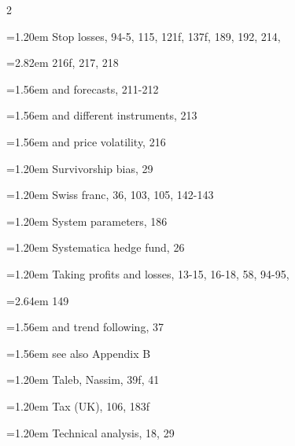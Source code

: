 {\begin{multicols}{2}
\par \noindent\hangindent=1.20em\hspace*{0.00em} Stop losses, 94-5, 115, 121f, 137f, 189, 192, 214,
\par \noindent\hangindent=2.82em\hspace*{1.62em} 216f, 217, 218
\par \noindent\hangindent=1.56em\hspace*{0.36em} and forecasts, 211-212
\par \noindent\hangindent=1.56em\hspace*{0.36em} and different instruments, 213
\par \noindent\hangindent=1.56em\hspace*{0.36em} and price volatility, 216
\par \noindent\hangindent=1.20em\hspace*{0.00em} Survivorship bias, 29
\par \noindent\hangindent=1.20em\hspace*{0.00em} Swiss franc, 36, 103, 105, 142-143
\par \noindent\hangindent=1.20em\hspace*{0.00em} System parameters, 186
\par \noindent\hangindent=1.20em\hspace*{0.00em} Systematica hedge fund, 26
\par \noindent\hangindent=1.20em\hspace*{0.00em} Taking profits and losses, 13-15, 16-18, 58, 94-95,
\par \noindent\hangindent=2.64em\hspace*{1.44em} 149
\par \noindent\hangindent=1.56em\hspace*{0.36em} and trend following, 37
\par \noindent\hangindent=1.56em\hspace*{0.36em} see also Appendix B
\par \noindent\hangindent=1.20em\hspace*{0.00em} Taleb, Nassim, 39f, 41
\par \noindent\hangindent=1.20em\hspace*{0.00em} Tax (UK), 106, 183f
\par \noindent\hangindent=1.20em\hspace*{0.00em} Technical analysis, 18, 29

\end{multicols}}
